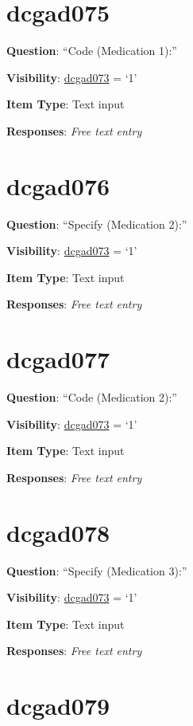 \documentclass[]{book}
\begin{document}
\hypertarget{dcgad075}{%
\section{dcgad075}\label{dcgad075}}

\textbf{Question}: ``Code (Medication 1):''

\textbf{Visibility}: \protect\hyperlink{dcgad073}{dcgad073} = `1'

\textbf{Item Type}: Text input

\textbf{Responses}: \emph{Free text entry}

\hypertarget{dcgad076}{%
\section{dcgad076}\label{dcgad076}}

\textbf{Question}: ``Specify (Medication 2):''

\textbf{Visibility}: \protect\hyperlink{dcgad073}{dcgad073} = `1'

\textbf{Item Type}: Text input

\textbf{Responses}: \emph{Free text entry}

\hypertarget{dcgad077}{%
\section{dcgad077}\label{dcgad077}}

\textbf{Question}: ``Code (Medication 2):''

\textbf{Visibility}: \protect\hyperlink{dcgad073}{dcgad073} = `1'

\textbf{Item Type}: Text input

\textbf{Responses}: \emph{Free text entry}

\hypertarget{dcgad078}{%
\section{dcgad078}\label{dcgad078}}

\textbf{Question}: ``Specify (Medication 3):''

\textbf{Visibility}: \protect\hyperlink{dcgad073}{dcgad073} = `1'

\textbf{Item Type}: Text input

\textbf{Responses}: \emph{Free text entry}

\hypertarget{dcgad079}{%
\section{dcgad079}\label{dcgad079}}
\end{document}
